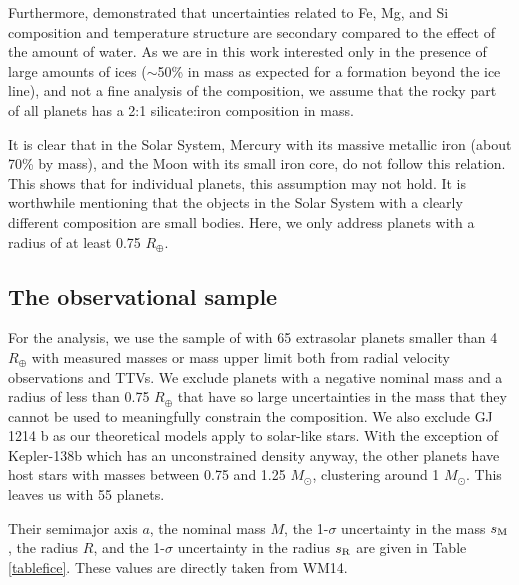 \documentclass[]{emulateapj}
\def\rearth{R_{\oplus}}
\def\msun{M_{\odot}}
\begin{document}
Furthermore, \citet[][hereafter GSS09]{Grasset2009} demonstrated that uncertainties related to Fe, Mg, and Si composition and temperature structure are secondary compared to the effect of the amount of water. As we are in this work interested only in the presence of large amounts of ices ($\sim$50\% in mass as expected for a formation beyond the ice line), and not a fine analysis of the composition, we assume that the rocky part of all planets has a 2:1 silicate:iron composition in mass.

It is clear that in the Solar System, Mercury with its massive metallic iron (about 70\% by mass), and the Moon with its small iron core, do not follow this relation. This shows that for individual planets, this assumption may not hold.  It is worthwhile mentioning that the objects in the Solar System with a clearly different composition are small bodies. Here, we only address planets with a radius of at least 0.75 $\rearth$.

\subsection{{The observational sample}}
For the analysis, we use the sample of \citet[][hereafter WM14]{WeissMarcy2014}  with 65 extrasolar planets smaller than 4 $\rearth$ with measured masses or mass upper limit both from radial velocity observations and TTVs. We exclude planets with a negative nominal mass and a radius of less than 0.75 $\rearth$ that have so large uncertainties in the mass that they cannot be used to meaningfully constrain the composition. We also exclude GJ 1214 b as our theoretical models apply to solar-like stars. With the exception of Kepler-138b which has an unconstrained density anyway, the other planets have host stars with masses between 0.75 and 1.25 $\msun$, clustering around 1 $\msun$. This leaves us with 55 planets.

Their semimajor axis $a$, the nominal mass $M$, the 1-$\sigma$ uncertainty in the mass $s_{\rm M}$, the radius $R$, and the 1-$\sigma$ uncertainty in the radius $s_{\rm R}$ are given in Table \ref{tablefice}. These values are directly taken from  WM14.
\end{document}
